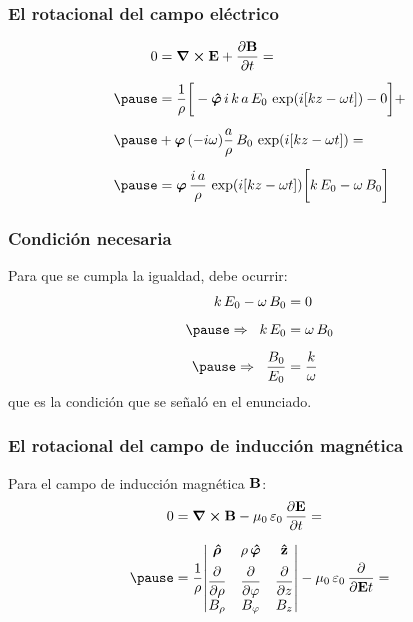 \documentclass[12pt]{beamer}
\begin{document}
\begin{frame}
\frametitle{El rotacional del campo eléctrico}
\begin{eqnarray*}
\begin{aligned}
0 &= \curl{\vb{E}} + \pdv{\vb{B}}{t} = \\[0.5em] \pause
&= \dfrac{1}{\rho} \bigg[ - \vu{\bm{\varphi}} \, i \, k \, a \, E_{0} \, \exp(i [k z - \omega t]) - 0 \bigg] + \\[0.5em] \pause
&+ \vb{\bm{\varphi}} \, (- i \omega) \dfrac{a}{\rho} \, B_{0} \, \exp(i [k z - \omega t]) = \\[0.5em] \pause
&= \vb{\bm{\varphi}} \, \dfrac{i \, a}{\rho} \, \exp(i [k z - \omega t]) \bigg[ k \, E_{0} - \omega \, B_{0} \bigg]
\end{aligned}
\end{eqnarray*}
\end{frame}
\begin{frame}
\frametitle{Condición necesaria}
Para que se cumpla la igualdad, debe ocurrir:
\pause
\begin{eqnarray*}
\begin{aligned}
k \, E_{0} - \omega \, B_{0} &= 0 \\[0.5em] \pause
\Rightarrow \hspace{0.2cm} k \, E_{0} &= \omega \, B_{0} \\[0.5em] \pause
\Rightarrow \hspace{0.2cm} \dfrac{B_{0}}{E_{0}} &= \dfrac{k}{\omega}
\end{aligned}
\end{eqnarray*}
que es la condición que se señaló en el enunciado.
\end{frame}
\begin{frame}
\frametitle{El rotacional del campo de inducción magnética}
Para el campo de inducción magnética $\vb{B}$:
\pause
\begin{eqnarray*}
\begin{aligned}
0 &= \curl{\vb{B}} - \mu_{0} \, \varepsilon_{0} \, \pdv{\vb{E}}{t} = \\[0.5em] \pause
&= \dfrac{1}{\rho} \mqty|
\vu{\bm{\rho}} & \rho \, \vu{\bm{\varphi}} & \vu{z} \\[0.5em]
\displaystyle \pdv{\rho} & \displaystyle  \pdv{\varphi} & \displaystyle \pdv{z} \\[0.5em]
B_{\rho} & B_{\varphi} & B_{z} | - \mu_{0} \, \varepsilon_{0} \, \pdv{\vb{E}{t}} = 
\end{aligned}
\end{eqnarray*}
\end{frame}
\end{document}
